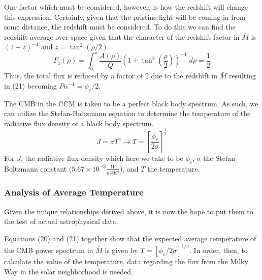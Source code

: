 \documentclass[a4paper]{article}
\begin{document}
    One factor which must be considered, however, is how the redshift will
    change this expression. Certainly, given that the pristine light will be
    coming in from some distance, the redshift must be considered. To do this
    we can find the redshift average over space given that the character of 
    the redshift factor in $\bar{M}$ is $(1+z)^{-1}$ and $z=\tan^2(\rho/ 2)
    $\cite{segal_b}.
    \begin{equation}
        F_z(\rho)=\int_0^{\pi} \frac{A(\rho)}{Q} 
                \left(1+\tan^2\left(\frac{\rho}{2}\right)\right)^{-1}
               \;d\rho = \frac{1}{2} 
    \end{equation}
    Thus, the total flux is reduced by a factor of 2 due to the redshift in
    $\bar{M}$ resulting in (21) becoming $P\alpha^{-1}=\phi_e/2$.

    The CMB in the CCM is taken to be a perfect black
    body spectrum. As such, we can utilize the Stefan-Boltzmann equation to
    determine the temperature of the radiative flux density of a black body
    spectrum.
    \begin{equation}
        J = \sigma T^4 \longrightarrow
        {T=\left[\frac{\phi_e}{2\sigma}\right]^{\frac{1}{4}}}
    \end{equation}
    For $J$, the radiative flux density which here we take to be $\phi_e$, 
    $\sigma$ the Stefan-Boltzmann constant ($5.67 × 10^{-8} \frac{W}{m^2
    K^4}$), and $T$ the temperature\footnotemark. 


    \subsubsection{Analysis of Average Temperature}
    Given the unique relationships derived above, it is now the hope to put
    them to the test of actual astrophysical data. 

    Equations (20) and (21) together show that the expected average temperature
    of the CMB power spectrum in $\bar{M}$ is given by $T =
    \left[\phi_e/2\sigma\right]^{1/4}$. In order, then, to calculate the value
    of the temperature, data regarding the flux from the Milky Way in the solar
    neighborhood is needed. 
\end{document}
